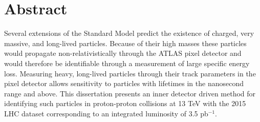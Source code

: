 


\begingroup
\let\clearpage\relax
\let\cleardoublepage\relax
\let\cleardoublepage\relax

\chapter*{Abstract}
Several extensions of the Standard Model predict the existence of charged, very massive, and long-lived particles. Because of their high masses these particles would propagate non-relativistically through the ATLAS pixel detector and would therefore be identifiable through a measurement of large specific energy loss. Measuring heavy, long-lived particles through their track parameters in the pixel detector allows sensitivity to particles with lifetimes in the nanosecond range and above. This dissertation presents an inner detector driven method for identifying such particles in proton-proton collisions at 13 TeV with the 2015 \acs*{LHC} dataset corresponding to an integrated luminosity of 3.5 pb$^{-1}$.
\endgroup			

\vfill
